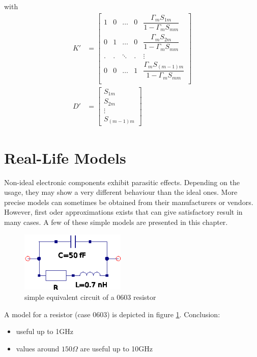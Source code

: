 with
\begin{align}
K' &=
\begin{bmatrix}
1 & 0 & \ldots & 0 & \dfrac{\Gamma_m S_{1m}}{1 - \Gamma_m S_{mm}}\\
0 & 1 & \ldots & 0 & \dfrac{\Gamma_m S_{2m}}{1 - \Gamma_m S_{mm}}\\
. & . & \ddots & . & \vdots\\
0 & 0 & \ldots & 1 & \dfrac{\Gamma_m S_{(m-1)m}}{1 - \Gamma_m S_{mm}}\\
\end{bmatrix}\\
D' &=
\begin{bmatrix}
S_{1m}\\
S_{2m}\\
\vdots\\
S_{(m-1)m}
\end{bmatrix}
\end{align}


\section{Real-Life Models}

Non-ideal electronic components exhibit parasitic effects.
Depending on the usage, they may show a very different behaviour than
the ideal ones. More precise models can sometimes be obtained from their
manufacturers or vendors. However, first oder approximations exists
that can give satisfactory result in many cases. A few of these simple
models are presented in this chapter.

\addvspace{12pt}

\begin{figure}[ht]
\begin{center}
\includegraphics[width=5cm]{Real_r}
\end{center}
\caption{simple equivalent circuit of a 0603 resistor}
\label{fig:real_r}
\end{figure}
\FloatBarrier

A model for a resistor (case 0603) is depicted in figure \ref{fig:real_r}.
Conclusion:
\begin{itemize}
\item useful up to 1GHz
\item values around $150\Omega$ are useful up to 10GHz
\end{itemize}

